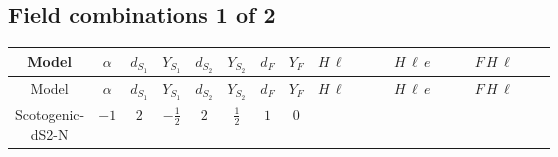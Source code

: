 \documentclass[8pt]{article}
\begin{document}
\begin{landscape}
\subsection*{Field combinations 1 of 2}
\begin{longtable}{@{}cccccccc >{\raggedright\arraybackslash}p{0.21\linewidth} >{\raggedright\arraybackslash}p{0.21\linewidth} >{\raggedright\arraybackslash}p{0.21\linewidth}@{}}
\toprule
Model & $\alpha$ & $d_{S_1}$ & $Y_{S_1}$ & $d_{S_2}$ & $Y_{S_2}$ & $d_F$ & $Y_F$ & $H\,\ell$ & $H\,\ell\,e$ & $F\,H\,\ell$ \\
\midrule
\endfirsthead
\toprule
Model & $\alpha$ & $d_{S_1}$ & $Y_{S_1}$ & $d_{S_2}$ & $Y_{S_2}$ & $d_F$ & $Y_F$ & $H\,\ell$ & $H\,\ell\,e$ & $F\,H\,\ell$ \\
\midrule
\endhead
Scotogenic-dS2-N & $-1$ & $2$ & $-\frac{1}{2}$ & $2$ & $\frac{1}{2}$ & $1$ & $0$ & \scriptsize\adjustbox{max width=\linewidth}{$\begin{gathered} +\frac{2 \hbar  \overline{y_{1,i_1,r_1}} \overline{y_{2,i_2,r_1}} L_{a_4,i_2}{}^T\, C\, P_L\, L_{a_2,i_1} H_{a_1} H_{a_3} \lambda_5 \epsilon_{a_1,a_2} \epsilon_{a_3,a_4}}{\sqrt{3} \epsilon  M_F} \\ +\frac{2 \hbar  \overline{y_{1,i_1,r_1}} \overline{y_{2,i_2,r_1}} L_{a_4,i_2}{}^T\, C\, P_L\, L_{a_2,i_1} H_{a_1} H_{a_3} \lambda_5 \epsilon_{a_1,a_2} \epsilon_{a_3,a_4}}{\sqrt{3} M_F} \\ +\frac{2 \hbar  \overline{\lambda_5} \overline{L_{a_3,i_1}}\, C\, P_R\, \overline{L_{a_4,i_2}}{}^T y_{1,i_1,r_1} y_{2,i_2,r_1} \epsilon_{a_1,a_3} \epsilon_{a_2,a_4} H_{a_1}{}^{\dagger } H_{a_2}{}^{\dagger }}{\sqrt{3} \epsilon  M_F}\end{gathered}$} & \scriptsize\adjustbox{max width=\linewidth}{$\begin{gathered} \frac{\hbar  \overline{y_{1,i_3,r_1}} \overline{L_{a_1,i_2}}\, P_R\, e_{i_1} H_{a_1} y_{1,i_2,r_1} Y_{e,i_3,i_1}}{4 \epsilon } \\ +\frac{3}{8} \hbar  \overline{y_{1,i_3,r_1}} \overline{L_{a_1,i_2}}\, P_R\, e_{i_1} H_{a_1} y_{1,i_2,r_1} Y_{e,i_3,i_1} \\ +\frac{\hbar  \overline{y_{2,i_3,r_1}} \overline{L_{a_1,i_2}}\, P_R\, e_{i_1} H_{a_1} y_{2,i_2,r_1} Y_{e,i_3,i_1}}{4 \epsilon }\end{gathered}$} & \scriptsize\adjustbox{max width=\linewidth}{$\begin{gathered} +\frac{2 \hbar  \log \left(\frac{\bar{\mu}^{2}}{M_F^2}\right) \overline{y_{1,i_1,r_1}} \overline{y_{2,i_2,r_1}} L_{a_4,i_2}{}^T\, C\, P_L\, L_{a_2,i_1} H_{a_1} H_{a_3} \lambda_5 \epsilon_{a_1,a_2} \epsilon_{a_3,a_4}}{\sqrt{3} M_F} \\ +\frac{2 \hbar  \log \left(\frac{\bar{\mu}^{2}}{M_F^2}\right) \overline{\lambda_5} \overline{L_{a_3,i_1}}\, C\, P_R\, \overline{L_{a_4,i_2}}{}^T y_{1,i_1,r_1} y_{2,i_2,r_1} \epsilon_{a_1,a_3} \epsilon_{a_2,a_4} H_{a_1}{}^{\dagger } H_{a_2}{}^{\dagger }}{\sqrt{3} M_F}\end{gathered}$} \\

\end{longtable}
\end{landscape}
\end{document}
